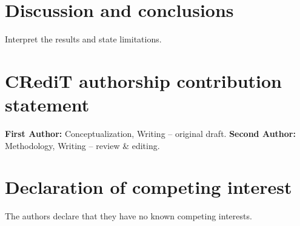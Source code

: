 \documentclass[preprint,12pt]{elsarticle}
\begin{document}
\section{Discussion and conclusions}
Interpret the results and state limitations.

\section*{CRediT authorship contribution statement}
\textbf{First Author:} Conceptualization, Writing -- original draft.
\textbf{Second Author:} Methodology, Writing -- review \& editing.

\section*{Declaration of competing interest}
The authors declare that they have no known competing interests.



\end{document}
